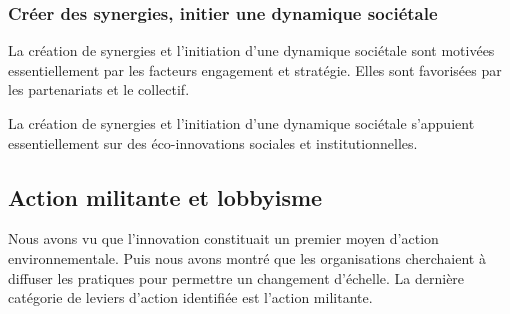             
        \subsubsection{Créer des synergies, initier une dynamique sociétale}
        
        
            \begin{hyp}
            \label{prop:I}
                La création de synergies et l'initiation d'une dynamique sociétale sont motivées essentiellement par les facteurs engagement et stratégie. Elles sont favorisées par les partenariats et le collectif.
            \end{hyp}
            \begin{hyp}
            \label{prop:J}
                 La création de synergies et l'initiation d'une dynamique sociétale s'appuient essentiellement sur des éco-innovations sociales et institutionnelles.
            \end{hyp}
        
    \subsection{Action militante et lobbyisme}
        
        Nous avons vu que l'innovation constituait un premier moyen d'action environnementale. Puis nous avons montré que les organisations cherchaient à diffuser les pratiques pour permettre un changement d'échelle. La dernière catégorie de leviers d'action identifiée est l'action militante.
        
